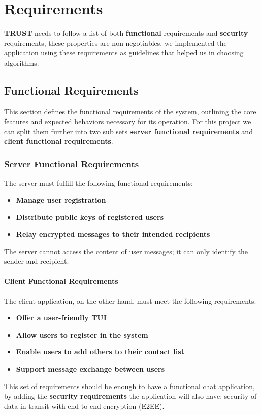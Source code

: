 \chapter{Requirements}
\label{cha:Requirements}

\textbf{TRUST} needs to follow a list of both \textbf{functional} requirements and \textbf{security} requirements, these properties are non negotiables, we implemented the application using these requirements as guidelines that helped us in choosing algorithms.

\section{Functional Requirements}
\label{sec:FunRequirements}

This section defines the functional requirements of the system, outlining the core features and expected behaviors necessary for its operation. For this project we can split them further into two sub sets \textbf{server functional requirements} and \textbf{client functional requirements}.

\subsection{Server Functional Requirements}
\label{subsec:ServerFunctionalRequirements}

The server must fulfill the following functional requirements:
\begin{itemize}
    \item \textbf{Manage user registration}
    \item \textbf{Distribute public keys of registered users}
    \item \textbf{Relay encrypted messages to their intended recipients}
\end{itemize}
The server cannot access the content of user messages; it can only identify the sender and recipient.

\subsubsection{Client Functional Requirements}
\label{ClientFunctionalRequirements}

The client application, on the other hand, must meet the following requirements:\begin{itemize}
    \item \textbf{Offer a user-friendly TUI}
    \item \textbf{Allow users to register in the system}
    \item \textbf{Enable users to add others to their contact list}
    \item \textbf{Support message exchange between users}
\end{itemize}
This set of requirements should be enough to have a functional chat application, by adding the \textbf{security requirements} the application will also have: security of data in transit with end-to-end-encryption (E2EE).

